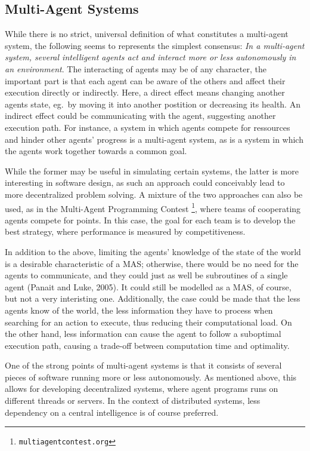 \subsection{Multi-Agent Systems}

While there is no strict, universal definition of what constitutes
a multi-agent system, the following seems to represents the simplest
consensus: \emph{In a multi-agent system, several intelligent agents
act and interact more or less autonomously in an environment}. The
interacting of agents may be of any character, the important part
is that each agent can be aware of the others and affect their execution
directly or indirectly. Here, a direct effect means changing another
agents state, eg.\ by moving it into another postition or decreasing
its health. An indirect effect could be communicating with the agent,
suggesting another execution path. For instance, a system in which
agents compete for ressources and hinder other agents' progress is
a multi-agent system, as is a system in which the agents work together
towards a common goal. 

While the former may be useful in simulating certain systems, the
latter is more interesting in software design, as such an approach
could conceivably lead to more decentralized problem solving. A mixture
of the two approaches can also be used, as in the Multi-Agent Programming
Contest\texttt{\emph{}}%
\footnote{\texttt{multiagentcontest.org}%
}, where teams of cooperating agents compete for points. In this case,
the goal for each team is to develop the best strategy, where performance
is measured by competitiveness.

In addition to the above, limiting the agents' knowledge of the state
of the world is a desirable characteristic of a MAS; otherwise, there
would be no need for the agents to communicate, and they could just
as well be subroutines of a single agent (Panait and Luke, 2005).
It could still be modelled as a MAS, of course, but not a very interisting
one. Additionally, the case could be made that the less agents know
of the world, the less information they have to process when searching
for an action to execute, thus reducing their computational load.
On the other hand, less information can cause the agent to follow
a suboptimal execution path, causing a trade-off between computation
time and optimality. 

One of the strong points of multi-agent systems is that it consists
of several pieces of software running more or less autonomously. As
mentioned above, this allows for developing decentralized systems,
where agent programs runs on different threads or servers. In the
context of distributed systems, less dependency on a central intelligence
is of course preferred. 

